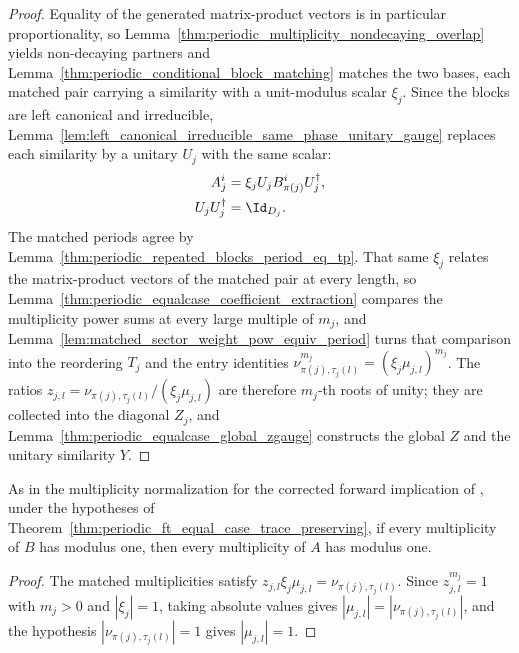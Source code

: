 \begin{proof}\leanok
    Equality of the generated matrix-product vectors is in particular
    proportionality, so
    Lemma~\ref{thm:periodic_multiplicity_nondecaying_overlap} yields
    non-decaying partners and
    Lemma~\ref{thm:periodic_conditional_block_matching} matches the two
    bases, each matched pair carrying a similarity with a unit-modulus scalar
    $\xi_j$. Since the blocks are left canonical and irreducible,
    Lemma~\ref{lem:left_canonical_irreducible_same_phase_unitary_gauge}
    replaces each similarity by a unitary $U_j$ with the same scalar:
    \begin{align}
        A_j^i          & =\xi_jU_jB_{\pi(j)}^iU_j^\dagger, \notag \\
        U_jU_j^\dagger & =\Id_{D_j}. \notag
    \end{align} The matched periods agree by
    Lemma~\ref{thm:periodic_repeated_blocks_period_eq_tp}. That same $\xi_j$
    relates the matrix-product vectors of the matched pair at every length, so
    Lemma~\ref{thm:periodic_equalcase_coefficient_extraction} compares the
    multiplicity power sums at every large multiple of $m_j$, and
    Lemma~\ref{lem:matched_sector_weight_pow_equiv_period} turns that
    comparison into the reordering $T_j$ and the entry identities
    $\nu_{\pi(j),\tau_j(l)}^{m_j}=(\xi_j\mu_{j,l})^{m_j}$. The ratios
    $z_{j,l}=\nu_{\pi(j),\tau_j(l)}/(\xi_j\mu_{j,l})$ are therefore $m_j$-th
    roots of unity; they are collected into the diagonal $Z_j$, and
    Lemma~\ref{thm:periodic_equalcase_global_zgauge} constructs the
    global $Z$ and the unitary similarity $Y$.
\end{proof}


\begin{corollary}
    \label{thm:periodic_equalcase_unit_weights}
    \leanok
    As in the multiplicity normalization for the corrected forward implication
    of \cite[Theorem~4.1, lines~743--756]{DeLasCuevas2017Irreducible}, under
    the hypotheses of Theorem~\ref{thm:periodic_ft_equal_case_trace_preserving},
    if every multiplicity of $B$ has modulus one, then every multiplicity
    of $A$ has modulus one.
\end{corollary}

\begin{proof}\leanok
    The matched multiplicities satisfy
    $z_{j,l}\xi_j\mu_{j,l}=\nu_{\pi(j),\tau_j(l)}$.
    Since $z_{j,l}^{m_j}=1$ with $m_j>0$ and $|\xi_j|=1$, taking
    absolute values gives $|\mu_{j,l}|=|\nu_{\pi(j),\tau_j(l)}|$, and the
    hypothesis $|\nu_{\pi(j),\tau_j(l)}|=1$ gives $|\mu_{j,l}|=1$.
\end{proof}
